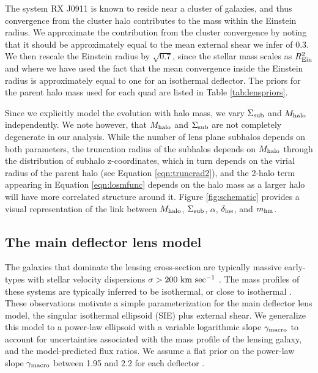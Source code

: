 The system RX J0911 is known to reside near a cluster of galaxies, and thus convergence from the cluster halo contributes to the mass within the Einstein radius. We approximate the contribution from the cluster convergence by noting that it should be approximately equal to the mean external shear we infer of 0.3. We then rescale the Einstein radius by $\sqrt{0.7}$, since the stellar mass scales as $R_{\rm{Ein}}^2$ and where we have used the fact that the mean convergence inside the Einstein radius is approximately equal to one for an isothermal deflector. The priors for the parent halo mass used for each quad are listed in Table \ref{tab:lenspriors}.  

Since we explicitly model the evolution with halo mass, we vary $\Sigma_{\rm{sub}}$ and $M_{\rm{halo}}$ independently. We note however, that $M_{\rm{halo}}$ and $\Sigma_{\rm{sub}}$ are not completely degenerate in our analysis. While the number of lens plane subhalos depends on both parameters, the truncation radius of the subhalos depends on $M_{\rm{halo}}$ through the distribution of subhalo z-coordinates, which in turn depends on the virial radius of the parent halo (see Equation \ref{eqn:truncrad2}), and the 2-halo term appearing in Equation \ref{eqn:losmfunc} depends on the halo mass as a larger halo will have more correlated structure around it. Figure \ref{fig:schematic} provides a visual representation of the link between $M_{\rm{halo}}$, $\Sigma_{\rm{sub}}$, $\alpha$, $\delta_{\rm{los}}$, and ${m_{\rm{hm}}}$. 

\subsection{The main deflector lens model}
\label{ssec:macromodels}
The galaxies that dominate the lensing cross-section are typically massive early-types with stellar velocity dispersions $\sigma > 200 \ \rm{km} \ \rm{sec^{-1}}$ \citep{Gavazzi++07,Auger++10,Lagattuta++10}. The mass profiles of these systems are typically inferred to be isothermal, or close to isothermal \citep{Treu++06, Treu++09, Auger++10, Shankar++17}. These observations motivate a simple parameterization for the main deflector lens model, the singular isothermal ellipsoid (SIE) plus external shear. We generalize this model to a power-law ellipsoid with a variable logarithmic slope $\gamma_{\rm{macro}}$ to account for uncertainties associated with the mass profile of the lensing galaxy, and the model-predicted flux ratios. We assume a flat prior on the power-law slope $\gamma_{\rm{macro}}$ between 1.95 and 2.2 for each deflector \citep{Auger++10}. 

